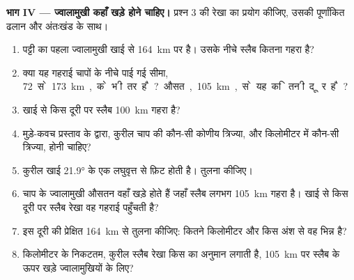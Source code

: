 \begin{problem}
\medskip
\noindent\textbf{भाग IV --- ज्वालामुखी कहाँ खड़े होने चाहिए।} प्रश्न 3 की रेखा का प्रयोग कीजिए, उसकी पूर्णांकित ढलान और अंतःखंड के साथ।
\begin{enumerate}[resume]
  \item पट्टी का पहला ज्वालामुखी खाई से \qty{164}{km} पर है। उसके नीचे स्लैब कितना गहरा है?
  \item क्या यह गहराई चापों के नीचे पाई गई सीमा, \qty{72} से \qty{173}{km}, के भीतर है? औसत, \qty{105}{km}, से यह कितनी दूर है?
  \item खाई से किस दूरी पर स्लैब \qty{100}{km} गहरा है?
  \item मुड़े-कवच प्रस्ताव के द्वारा, कुरील चाप की कौन-सी कोणीय त्रिज्या, और किलोमीटर में कौन-सी त्रिज्या, होनी चाहिए?
  \item कुरील खाई \ang{21.9} के एक लघुवृत्त से फ़िट होती है। तुलना कीजिए।
  \item चाप के ज्वालामुखी औसतन वहाँ खड़े होते हैं जहाँ स्लैब लगभग \qty{105}{km} गहरा है। खाई से किस दूरी पर स्लैब रेखा वह गहराई पहुँचती है?
  \item इस दूरी की प्रेक्षित \qty{164}{km} से तुलना कीजिए: कितने किलोमीटर और किस अंश से वह भिन्न है?
  \item किलोमीटर के निकटतम, कुरील स्लैब रेखा किस  का अनुमान लगाती है, \qty{105}{km} पर स्लैब के ऊपर खड़े ज्वालामुखियों के लिए?
\end{enumerate}
\end{problem}
